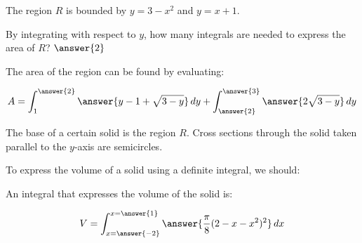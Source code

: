 \documentclass{ximera}
\author{Jim Talamo}
\begin{document}
The region $R$ is bounded by $y=3-x^2$ and $y=x+1$. 





\begin{exercise}
By integrating with respect to $y$, how many integrals are needed to express the area of $R$? $\answer{2}$

\begin{exercise}
The area of the region can be found by evaluating:

\[
	A = \int_1^{\answer{2}} \answer{y-1+\sqrt{3-y}} \d y  +\int_{\answer{2}}^{\answer{3}} \answer{2\sqrt{3-y}} \d y 
\]
	
\end{exercise}
\end{exercise}


\begin{exercise}
The base of a certain solid is the region $R$.  Cross sections through the solid taken parallel to the $y$-axis are semicircles. 


To express the volume of a solid using a definite integral, we should:
\begin{multipleChoice}
\end{multipleChoice}

An integral that expresses the volume of the solid is:

\[
	V= \int_{x=\answer{-2}}^{x=\answer{1}}\answer{\frac{\pi}{8}(2-x-x^2)^2} \d x
\]
		
		



\end{exercise}
\end{document}
